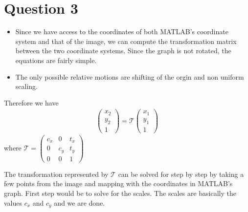 \documentclass[12pt]{article}
\begin{document}
\section*{Question 3}
    \begin{itemize}
        \item Since we have access to the coordinates of both MATLAB's coordinate system and that of the image, we can compute the 
        transformation matrix between the two coordinate systems. Since the graph is not rotated, the equations are fairly 
        simple.
        \item The only possible relative motions are shifting of the orgin and non uniform scaling.
    \end{itemize}

    Therefore we have 
    \begin{align*}
        \begin{pmatrix}
            x_{2} \\
            y_{2} \\
            1
        \end{pmatrix}
        = \mathcal{T} 
        \begin{pmatrix}
            x_{1} \\
            y_{1} \\
            1
        \end{pmatrix}
    \end{align*}
    where $\mathcal{T} = \begin{pmatrix}
                            c_{x} & 0 & t_{x} \\
                            0  & c_{y} & t_{y} \\
                            0 & 0 & 1
                        \end{pmatrix}$

    The transformation represented by $\mathcal{T}$ can be solved for step by step by taking a few points from the image 
    and mapping with the coordinates in MATLAB's graph. First step would be to solve for the scales.
    The scales are basically the values $c_{x}$ and $c_{y}$ and we are done.
    
\end{document}
